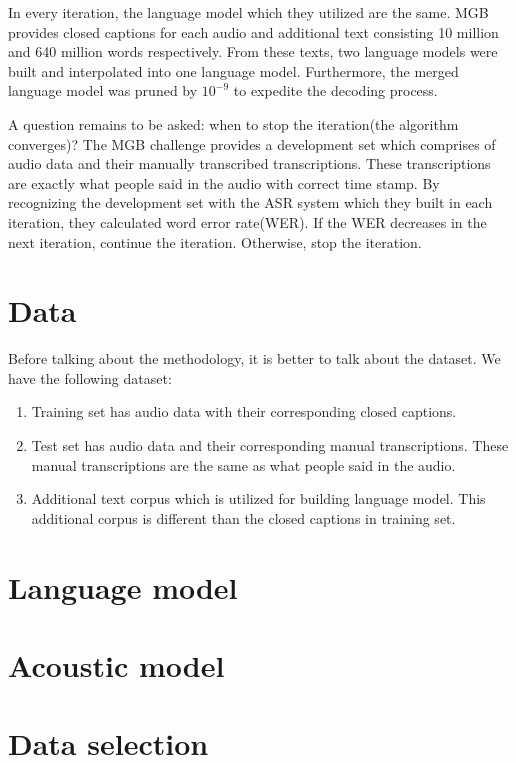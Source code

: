 In every iteration, the language model which they utilized are the same. MGB provides closed captions for each audio and additional text consisting 10 million and 640 million words respectively. From these texts, two language models were built and interpolated into one language model. Furthermore, the merged language model was pruned by $10^{-9}$ to expedite the decoding process.

A question remains to be asked: when to stop the iteration(the algorithm converges)? The MGB challenge provides a development set which comprises of audio data and their manually transcribed transcriptions. These transcriptions are exactly what people said in the audio with correct time stamp. By recognizing the development set with the ASR system which they built in each iteration, they calculated word error rate(WER). If the WER decreases in the next iteration, continue the iteration. Otherwise, stop the iteration.






\section{Data}
Before talking about the methodology, it is better to talk about the dataset. We have the following dataset:
\begin{enumerate}
\item Training set has audio data with their corresponding closed captions.
\item Test set has audio data and their corresponding manual transcriptions. These manual transcriptions are the same as what people said in the audio.
\item Additional text corpus which is utilized for building language model. This additional corpus is different than the closed captions in training set. 
\end{enumerate}




\section{Language model}



\section{Acoustic model}

\section{Data selection}

